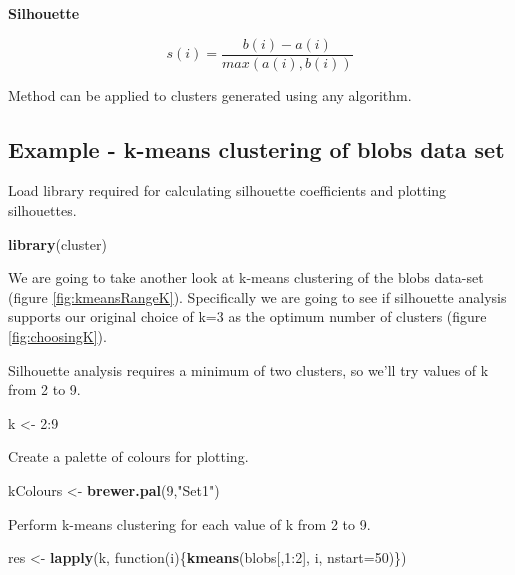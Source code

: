 \documentclass[]{book}
\newenvironment{Shaded}{\begin{snugshade}}{\end{snugshade}}
\newcommand{\KeywordTok}[1]{\textcolor[rgb]{0.13,0.29,0.53}{\textbf{{#1}}}}
\newcommand{\DataTypeTok}[1]{\textcolor[rgb]{0.13,0.29,0.53}{{#1}}}
\newcommand{\DecValTok}[1]{\textcolor[rgb]{0.00,0.00,0.81}{{#1}}}
\newcommand{\StringTok}[1]{\textcolor[rgb]{0.31,0.60,0.02}{{#1}}}
\newcommand{\NormalTok}[1]{{#1}}
\theoremstyle{definition}
\theoremstyle{definition}
\theoremstyle{definition}
\theoremstyle{remark}
\begin{document}
\textbf{Silhouette}

\begin{equation}
  s(i) = \frac{b(i) - a(i)}{max\left(a(i),b(i)\right)}
  \label{eq:silhouette}
\end{equation}

Method can be applied to clusters generated using any algorithm.

\subsection{Example - k-means clustering of blobs data
set}\label{example---k-means-clustering-of-blobs-data-set}

Load library required for calculating silhouette coefficients and
plotting silhouettes.

\begin{Shaded}
\begin{Highlighting}[]
\KeywordTok{library}\NormalTok{(cluster)}
\end{Highlighting}
\end{Shaded}

We are going to take another look at k-means clustering of the blobs
data-set (figure \ref{fig:kmeansRangeK}). Specifically we are going to
see if silhouette analysis supports our original choice of k=3 as the
optimum number of clusters (figure \ref{fig:choosingK}).

Silhouette analysis requires a minimum of two clusters, so we'll try
values of k from 2 to 9.

\begin{Shaded}
\begin{Highlighting}[]
\NormalTok{k <-}\StringTok{ }\DecValTok{2}\NormalTok{:}\DecValTok{9}
\end{Highlighting}
\end{Shaded}

Create a palette of colours for plotting.

\begin{Shaded}
\begin{Highlighting}[]
\NormalTok{kColours <-}\StringTok{ }\KeywordTok{brewer.pal}\NormalTok{(}\DecValTok{9}\NormalTok{,}\StringTok{"Set1"}\NormalTok{)}
\end{Highlighting}
\end{Shaded}

Perform k-means clustering for each value of k from 2 to 9.

\begin{Shaded}
\begin{Highlighting}[]
\NormalTok{res <-}\StringTok{ }\KeywordTok{lapply}\NormalTok{(k, function(i)\{}\KeywordTok{kmeans}\NormalTok{(blobs[,}\DecValTok{1}\NormalTok{:}\DecValTok{2}\NormalTok{], i, }\DataTypeTok{nstart=}\DecValTok{50}\NormalTok{)\})}
\end{Highlighting}
\end{Shaded}
\end{document}
